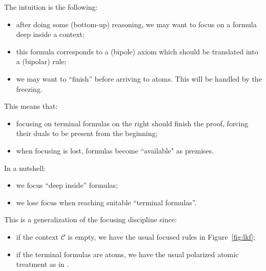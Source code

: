 \documentclass{llncs}
\begin{document}
The intuition is the following: 
\begin{itemize}
\item after doing some (bottom-up) reasoning, we may want to focus on a formula deep inside a context;
\item this formula corresponds to a (bipole) axiom which should be translated into a (bipolar) rule;
\item we may want to ``finish'' before arriving to atoms. This will be handled by the freezing.
\end{itemize}
This means that:
\begin{itemize} 
\item focusing on terminal formulas on the right should finish the proof, forcing their duals to be present from the beginning; 
\item when focusing is lost, formulas become ``available" as premises. 
\end{itemize}
In a nutshell: 
\begin{itemize}
\item we focus ``deep inside'' formulas;
\item we lose focus when reaching suitable ``terminal formulas''.
\end{itemize}
This is a generalization of the focusing discipline since:
\begin{itemize}
\item if the context $\mathcal{C}$ is empty, we have the usual focused rules in Figure~\ref{fig:lkf};
\item if the terminal formulas are atoms, we have the usual polarized atomic treatment as in \LKF.
\end{itemize}
\end{document}
